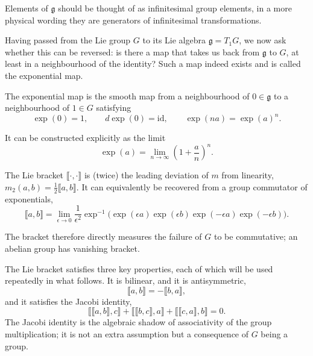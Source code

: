Elements of $\mathfrak g$ should be thought of as
infinitesimal group elements, in a more physical wording they are generators of infinitesimal
transformations.

Having passed from the Lie group $G$ to its Lie algebra
$\mathfrak{g} = T_1 G$, we now ask whether this can be reversed: is
there a map that takes us back from $\mathfrak{g}$ to $G$, at least in
a neighbourhood of the identity? Such a map indeed exists and is
called the exponential map.

\begin{definition}
The exponential map is the smooth map from a neighbourhood of
$0 \in \mathfrak g$ to a neighbourhood of $1 \in G$ satisfying
\begin{equation}
    \exp(0) = 1, \qquad d\exp(0) = \mathrm{id}, \qquad \exp(na) = \exp(a)^n.
\end{equation}
\end{definition}

It can be constructed explicitly as the limit
\begin{equation}
    \exp(a) = \lim_{n\to\infty}\left(1+\frac{a}{n}\right)^n.
\end{equation}

\begin{definition}
The Lie bracket $\llbracket \cdot,\cdot \rrbracket$ is (twice) the
leading deviation of $m$ from linearity, $m_2(a,b) =
\tfrac12 \llbracket a,b \rrbracket$. It can equivalently be recovered
from a group commutator of exponentials,
\begin{equation}
    \llbracket a,b \rrbracket
    = \lim_{\epsilon \to 0} \frac{1}{\epsilon^2}
      \exp^{-1}\!\Big(\exp(\epsilon a)\exp(\epsilon b)\exp(-\epsilon a)\exp(-\epsilon b)\Big).
\end{equation}
\end{definition}

The bracket therefore directly measures the failure of $G$ to be
commutative; an abelian group has vanishing bracket.

The Lie bracket satisfies three key properties, each of which will be
used repeatedly in what follows. It is bilinear, and it is
antisymmetric,
\begin{equation}
    \llbracket a,b \rrbracket = -\llbracket b,a \rrbracket,
\end{equation}
and it satisfies the Jacobi identity,
\begin{equation}
    \big\llbracket \llbracket a,b\rrbracket, c\big\rrbracket
    + \big\llbracket \llbracket b,c\rrbracket, a\big\rrbracket
    + \big\llbracket \llbracket c,a\rrbracket, b\big\rrbracket = 0.
\end{equation}
The Jacobi identity is the algebraic shadow of associativity of the
group multiplication; it is not an extra assumption but a consequence
of $G$ being a group.

